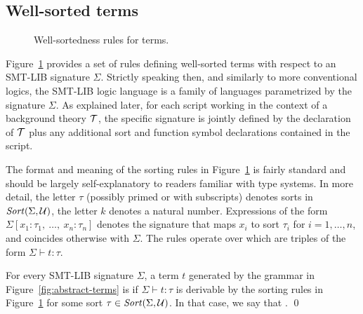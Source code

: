 



\subsection{Well-sorted terms}
 
\begin{figure}
 \termrules
\caption{Well-sortedness rules for terms.}
\label{fig:well-sorted-terms}
\end{figure}

Figure~\ref{fig:well-sorted-terms} provides a set of rules defining 
well-sorted terms with respect to an SMT-LIB signature $\Sigma$.
Strictly speaking then, and similarly to more conventional logics,
the SMT-LIB logic language is a family of languages parametrized 
by the signature $\Sigma$.
As explained later, 
for each script working in the context of a background theory $\mathcal{T}$,
the specific signature is jointly defined by the declaration of $\mathcal{T}$ plus
any additional sort and function symbol declarations contained in the script.

The format and meaning of the sorting rules in Figure~\ref{fig:well-sorted-terms} 
is fairly standard and should be largely self-explanatory 
to readers familiar with type systems.
In more detail, the letter $\tau$ (possibly primed or with subscripts) 
denotes sorts in $\mathit{Sort}(\Sigma, \mathcal{U})$,
the letter $k$ denotes a natural number.
%
Expressions of the form $\Sigma[x_1:\tau_1,\: \ldots,\: x_n:\tau_n]$ 
denotes the signature 
that maps $x_i$ to sort $\tau_i$ for $i=1,\ldots,n$, and 
coincides otherwise with $\Sigma$.
The rules operate over 
which are triples of the form $\Sigma \vdash t : \tau$.

\begin{definition}
For every SMT-LIB signature $\Sigma$,
a term $t$ generated by the grammar in Figure~\ref{fig:abstract-terms}
is 
if $\Sigma \vdash t : \tau$ is derivable 
by the sorting rules in Figure~\ref{fig:well-sorted-terms}
for some sort $\tau \in \mathit{Sort}(\Sigma,\mathcal{U})$.
In that case, 
we say that .
\qed
\end{definition}

